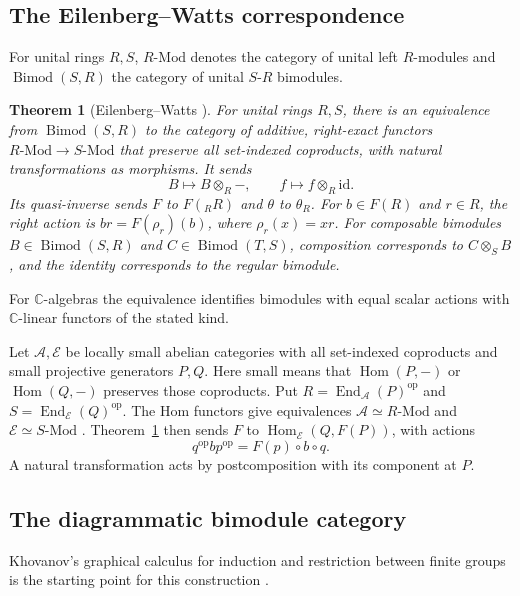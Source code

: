 \documentclass[11pt,a4paper]{article}
\numberwithin{equation}{section}
\newtheorem{theorem}{Theorem}[section]
\theoremstyle{definition}
\newcommand{\C}{\mathbb C}
\newcommand{\Mod}{\text{-}\mathrm{Mod}}
\newcommand{\Bimod}{\operatorname{Bimod}}
\newcommand{\Hom}{\operatorname{Hom}}
\newcommand{\End}{\operatorname{End}}
\newcommand{\op}{\mathrm{op}}
\newcommand{\id}{\mathrm{id}}
\begin{document}
\subsection{The Eilenberg--Watts correspondence}

For unital rings \(R,S\), \(R\Mod\) denotes the category of unital left
\(R\)-modules and \(\Bimod(S,R)\) the category of unital \(S\)-\(R\)
bimodules.

\begin{theorem}[Eilenberg--Watts \cite{watts,getcurious}]\label{thm:ew}
For unital rings \(R,S\), there is an equivalence from \(\Bimod(S,R)\)
to the category of additive, right-exact functors \(R\Mod\to S\Mod\)
that preserve all set-indexed coproducts, with natural transformations
as morphisms. It sends
\[
  B\longmapsto B\otimes_R-,\qquad f\longmapsto f\otimes_R\id .
\]
Its quasi-inverse sends \(F\) to \(F({}_R R)\) and \(\theta\) to
\(\theta_R\). For \(b\in F(R)\) and \(r\in R\), the right action is
\(br=F(\rho_r)(b)\), where \(\rho_r(x)=xr\). For composable bimodules
\(B\in\Bimod(S,R)\) and \(C\in\Bimod(T,S)\), composition corresponds to
\(C\otimes_S B\), and the identity corresponds to the regular bimodule.
\end{theorem}

For \(\C\)-algebras the equivalence identifies bimodules with equal
scalar actions with \(\C\)-linear functors of the stated kind.

Let \(\mathcal A,\mathcal E\) be locally small abelian categories with
all set-indexed coproducts and small projective generators \(P,Q\).
Here small means that \(\Hom(P,-)\) or \(\Hom(Q,-)\) preserves those
coproducts. Put \(R=\End_{\mathcal A}(P)^\op\) and
\(S=\End_{\mathcal E}(Q)^\op\). The Hom functors give equivalences
\(\mathcal A\simeq R\Mod\) and \(\mathcal E\simeq S\Mod\)
\cite[Chs.~8--10]{getcurious}. Theorem~\ref{thm:ew} then sends \(F\) to
\(\Hom_{\mathcal E}(Q,F(P))\), with actions
\[
 q^\op b p^\op=F(p)\circ b\circ q.
\]
A natural transformation acts by postcomposition with its component
at \(P\).

\subsection{The diagrammatic bimodule category}\label{sec:diagram-category}

Khovanov's graphical calculus for induction and restriction between finite
groups is the starting point for this construction \cite[\S~3.2]{khovanov}.
\end{document}
